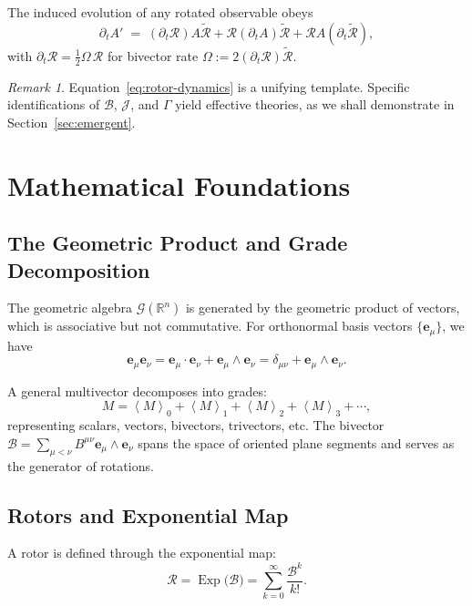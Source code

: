 \documentclass[11pt,a4paper]{article}
\newcommand{\e}{\mathbf{e}}
\newcommand{\R}{\mathbb{R}}
\newcommand{\grade}[2]{\left\langle #1 \right\rangle_{#2}}
\newcommand{\scal}[1]{\grade{#1}{0}}
\newcommand{\vecp}[1]{\grade{#1}{1}}
\newcommand{\biv}[1]{\grade{#1}{2}}
\newcommand{\triv}[1]{\grade{#1}{3}}
\newcommand{\rev}[1]{\widetilde{#1}}           %
\newcommand{\Exp}{\operatorname{Exp}}
\newcommand{\Rotor}{\mathcal{R}}
\newcommand{\Biv}{\mathcal{B}}
\theoremstyle{definition}
\theoremstyle{plain}
\theoremstyle{remark}
\newtheorem{remark}{Remark}
\begin{document}
The induced evolution of any rotated observable obeys
\begin{equation}
  \partial_t A' \;=\; \left(\partial_t \Rotor\right) A \rev{\Rotor} + \Rotor \left(\partial_t A\right)\rev{\Rotor} + \Rotor A \left(\partial_t\rev{\Rotor}\right),
\end{equation}
with $\partial_t \Rotor = \frac{1}{2}\Omega\,\Rotor$ for bivector rate $\Omega:=2(\partial_t \Rotor)\rev{\Rotor}$.

\begin{remark}
Equation~\eqref{eq:rotor-dynamics} is a unifying template. Specific identifications of $\Biv$, $\mathcal{J}$, and $\Gamma$ yield effective theories, as we shall demonstrate in Section~\ref{sec:emergent}.
\end{remark}

\vspace{1em}

\section{Mathematical Foundations}\label{sec:math}

\subsection{The Geometric Product and Grade Decomposition}

The geometric algebra $\mathcal{G}(\R^n)$ is generated by the geometric product of vectors, which is associative but not commutative. For orthonormal basis vectors $\{\e_\mu\}$, we have
\begin{equation}
\e_\mu \e_\nu = \e_\mu \cdot \e_\nu + \e_\mu \wedge \e_\nu = \delta_{\mu\nu} + \e_\mu \wedge \e_\nu.
\end{equation}

A general multivector decomposes into grades:
\begin{equation}
M = \scal{M} + \vecp{M} + \biv{M} + \triv{M} + \cdots,
\end{equation}
representing scalars, vectors, bivectors, trivectors, etc. The bivector $\Biv = \sum_{\mu<\nu} B^{\mu\nu} \e_\mu \wedge \e_\nu$ spans the space of oriented plane segments and serves as the generator of rotations.

\subsection{Rotors and Exponential Map}

A rotor is defined through the exponential map:
\begin{equation}
\Rotor = \Exp\!\big(\Biv\big) = \sum_{k=0}^\infty \frac{\Biv^k}{k!}.
\end{equation}
\end{document}
